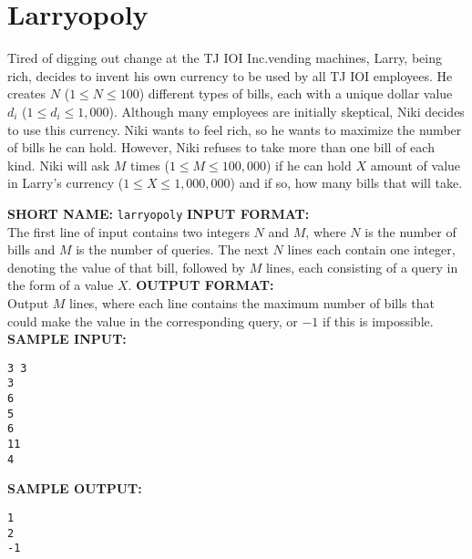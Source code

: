\section{Larryopoly}

Tired of digging out change at the TJ IOI Inc.\@ vending machines, Larry, being rich, decides to invent his own currency to be used by all TJ IOI employees. He creates $ N $ ($ 1 \leq N \leq 100 $) different types of bills, each with a unique dollar value $ d_i $ ($ 1 \leq d_i \leq 1,000 $).
\blank
Although many employees are initially skeptical, Niki decides to use this currency. Niki wants to feel rich, so he wants to maximize the number of bills he can hold. However, Niki refuses to take more than one bill of each kind. Niki will ask $ M $ times ($ 1 \leq M \leq 100,000 $) if he can hold $ X $ amount of value in Larry’s currency ($ 1 \leq X \leq 1,000,000 $) and if so, how many bills that will take.

\blank
\textbf{SHORT NAME:} \verb|larryopoly|
\blank
\textbf{INPUT FORMAT:}\\
The first line of input contains two integers $ N $ and $ M $, where $ N $ is the number of bills and $ M $ is the number of queries.  The next $ N $ lines each contain one integer, denoting the value of that bill, followed by $ M $ lines, each consisting of a query in the form of a value $ X $.
\blank
\textbf{OUTPUT FORMAT:}\\
Output $ M $ lines, where each line contains the maximum number of bills that could make the value in the corresponding query, or $ -1 $ if this is impossible.
\blank
\textbf{SAMPLE INPUT:}
\begin{verbatim}
3 3
3
6
5
6
11
4
\end{verbatim}
\textbf{SAMPLE OUTPUT:}
\begin{verbatim}
1
2
-1
\end{verbatim}
